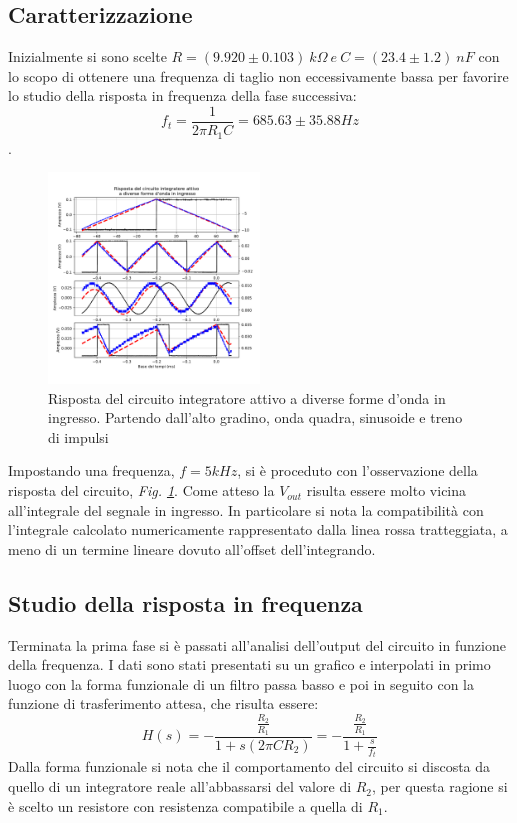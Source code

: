 \documentclass[journal]{IEEEtran}
\begin{document}
\subsection{\textbf{Caratterizzazione}}
Inizialmente si sono scelte $R = (9.920 \pm 0.103) \ k\Omega \ e \ C = (23.4 \pm 1.2) \ nF$ con lo scopo di ottenere una frequenza di taglio non eccessivamente bassa per favorire lo studio della risposta in frequenza della fase successiva: \[f_{t} = \frac{1}{2 \pi R_{1} C}= 685.63 \pm 35.88 Hz\].

\begin{figure}[H]%
\begin {center}
\includegraphics[width=0.50\textwidth]{analysis/output/OPA-integ-with-res.pdf}
\caption{Risposta del circuito integratore attivo a diverse forme d'onda in ingresso. Partendo dall'alto gradino, onda quadra, sinusoide e treno di impulsi}
\label{fig:OPA-integ-res}
\end {center}
\end{figure}
Impostando una frequenza, $f= 5 kHz$, si è proceduto con l'osservazione della risposta del circuito, \textit{Fig. \ref{fig:OPA-integ-res}}. Come atteso la $V_{out}$ risulta essere molto vicina all'integrale del segnale in ingresso. In particolare si nota la compatibilità con l'integrale calcolato numericamente rappresentato dalla linea rossa tratteggiata, a meno di un termine lineare dovuto all'offset dell'integrando.

\subsection{\textbf{Studio della risposta in frequenza}}

Terminata la prima fase si è passati all'analisi dell'output del circuito in funzione della frequenza. I dati sono stati presentati su un grafico e interpolati in primo luogo con la forma funzionale di un filtro passa basso e poi in seguito con la funzione di trasferimento attesa, che risulta essere: 
\[H(s) = -\frac{\frac{R_2}{R_1}}{1 + s(2 \pi C R_2)} = -\frac{\frac{R_2}{R_1}}{1 + \frac{s}{f_t}}\]
Dalla forma funzionale si nota che il comportamento del circuito si discosta da quello di un integratore reale all'abbassarsi del valore di $R_2$, per questa ragione si è scelto un resistore con resistenza compatibile a quella di $R_1$.
\end{document}
